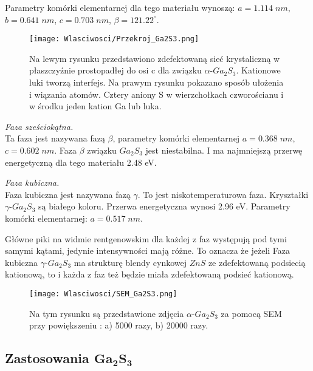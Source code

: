 Parametry komórki elementarnej dla tego materiału wynoszą: $a=1.114\;nm$, $b=0.641\;nm$, $c=0.703\;nm$, $\beta=121.22^{\circ}$.

\begin{figure}[H]
	\begin{center}
		\texttt{[image: Wlasciwosci/Przekroj\_Ga2S3.png]}
		\caption{Na lewym rysunku przedstawiono zdefektowaną sieć krystaliczną w płaszczyźnie prostopadłej do osi c dla związku $\alpha$-$Ga_{2}S_{3}$. Kationowe luki tworzą interfejs. Na prawym rysunku pokazano sposób ułożenia i wiązania atomów. Cztery aniony S w wierzchołkach czworościanu i w środku jeden kation Ga lub luka.}
	\end{center}
\end{figure}

\textit{Faza sześciokątna.} \\
Ta faza jest nazywana fazą $\beta$, parametry komórki elementarnej $a=0.368\;nm$,  $c=0.602\;nm$. Faza $\beta$ związku $Ga_{2}S_{3}$ jest niestabilna. I ma najmniejszą przerwę energetyczną dla tego materiału 2.48 eV.

\textit{Faza kubiczna.} \\
Faza kubiczna jest nazywana fazą $\gamma$. To jest niskotemperaturowa faza. Kryształki $\gamma$-$Ga_{2}S_{3}$ są białego koloru. Przerwa energetyczna wynosi 2.96 eV. Parametry komórki elementarnej: $a=0.517\;nm$.

Główne piki na widmie rentgenowskim dla każdej z faz występują pod tymi samymi kątami, jedynie intensywności mają różne. To oznacza że jeżeli Faza kubiczna $\gamma$-$Ga_{2}S_{3}$ ma strukturę blendy cynkowej $ZnS$ ze zdefektowaną podsiecią kationową, to i każda z faz też będzie miała zdefektowaną podsieć kationową.

\begin{figure}[H]
	\begin{center}
		\texttt{[image: Wlasciwosci/SEM\_Ga2S3.png]}
		\caption{Na tym rysunku są przedstawione zdjęcia $\alpha$-$Ga_{2}S_{3}$ za pomocą SEM przy powiększeniu : a) 5000 razy, b) 20000 razy.}
	\end{center}
\end{figure}

\subsection{Zastosowania $\mathbf{Ga_{2}S_{3}}$}

